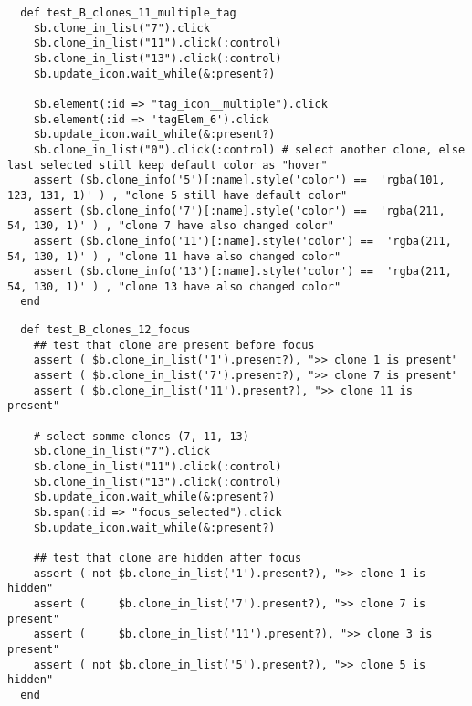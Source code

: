 \begin{verbatim}
  def test_B_clones_11_multiple_tag
    $b.clone_in_list("7").click
    $b.clone_in_list("11").click(:control)
    $b.clone_in_list("13").click(:control)
    $b.update_icon.wait_while(&:present?)

    $b.element(:id => "tag_icon__multiple").click
    $b.element(:id => 'tagElem_6').click
    $b.update_icon.wait_while(&:present?)
    $b.clone_in_list("0").click(:control) # select another clone, else last selected still keep default color as "hover"
    assert ($b.clone_info('5')[:name].style('color') ==  'rgba(101, 123, 131, 1)' ) , "clone 5 still have default color"
    assert ($b.clone_info('7')[:name].style('color') ==  'rgba(211, 54, 130, 1)' ) , "clone 7 have also changed color"
    assert ($b.clone_info('11')[:name].style('color') ==  'rgba(211, 54, 130, 1)' ) , "clone 11 have also changed color"
    assert ($b.clone_info('13')[:name].style('color') ==  'rgba(211, 54, 130, 1)' ) , "clone 13 have also changed color"
  end
\end{verbatim}

\begin{verbatim}
  def test_B_clones_12_focus
    ## test that clone are present before focus
    assert ( $b.clone_in_list('1').present?), ">> clone 1 is present"
    assert ( $b.clone_in_list('7').present?), ">> clone 7 is present"
    assert ( $b.clone_in_list('11').present?), ">> clone 11 is present"
    
    # select somme clones (7, 11, 13)
    $b.clone_in_list("7").click
    $b.clone_in_list("11").click(:control)
    $b.clone_in_list("13").click(:control)
    $b.update_icon.wait_while(&:present?)
    $b.span(:id => "focus_selected").click
    $b.update_icon.wait_while(&:present?)

    ## test that clone are hidden after focus
    assert ( not $b.clone_in_list('1').present?), ">> clone 1 is hidden"
    assert (     $b.clone_in_list('7').present?), ">> clone 7 is present"
    assert (     $b.clone_in_list('11').present?), ">> clone 3 is present"
    assert ( not $b.clone_in_list('5').present?), ">> clone 5 is hidden"
  end
\end{verbatim}

